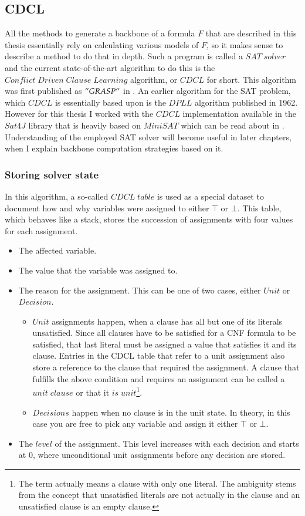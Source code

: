 \subsection{CDCL}
\label{ss:cdcl}
All the methods to generate a backbone of a formula $F$ that are described in this thesis essentially rely on calculating various models of $F$, so it makes sense to describe a method to do that in depth. Such a program is called a $SAT\; solver$ and the current state-of-the-art algorithm to do this is the $Conflict\;Driven\;Clause\;Learning$ algorithm, or $CDCL$ for short. This algorithm was first published as $"GRASP"$ in \cite{GRASP}. An earlier algorithm for the SAT problem, which $CDCL$ is essentially based upon is the $DPLL$ algorithm \cite{dpll} published in 1962. However for this thesis I worked with the $CDCL$ implementation available in the $Sat4J$ library that is heavily based on $MiniSAT$ which can be read about in \cite{minisat}. Understanding of the employed SAT solver will become useful in later chapters, when I explain backbone computation strategies based on it.

\subsubsection{Storing solver state}

In this algorithm, a so-called $CDCL\;table$ is used as a special dataset to document how and why variables were assigned to either $\top$ or $\bot$. This table, which behaves like a stack, stores the succession of assignments with four values for each assignment.
\begin{itemize}
\item The affected variable.
\item The value that the variable was assigned to.
\item The reason for the assignment. This can be one of two cases, either $Unit$ or $Decision$.
\begin{itemize}
\item $Unit$ assignments happen, when a clause has all but one of its literals unsatisfied. Since all clauses have to be satisfied for a CNF formula to be satisfied, that last literal must be assigned a value that satisfies it and its clause. Entries in the CDCL table that refer to a unit assignment also store a reference to the clause that required the assignment. A clause that fulfills the above condition and requires an assignment can be called a $unit\; clause$ or that it $is\; unit$\footnote{
	The term actually means a clause with only one literal. The ambiguity stems from the concept that unsatisfied literals are not actually in the clause and an unsatisfied clause is an empty clause.
}.
\item $Decisions$ happen when no clause is in the unit state. In theory, in this case you are free to pick any variable and assign it either $\top$ or $\bot$. 
\end{itemize}
\item The $level$ of the assignment. This level increases with each decision and starts at 0, where unconditional unit assignments before any decision are stored.
\end{itemize}

